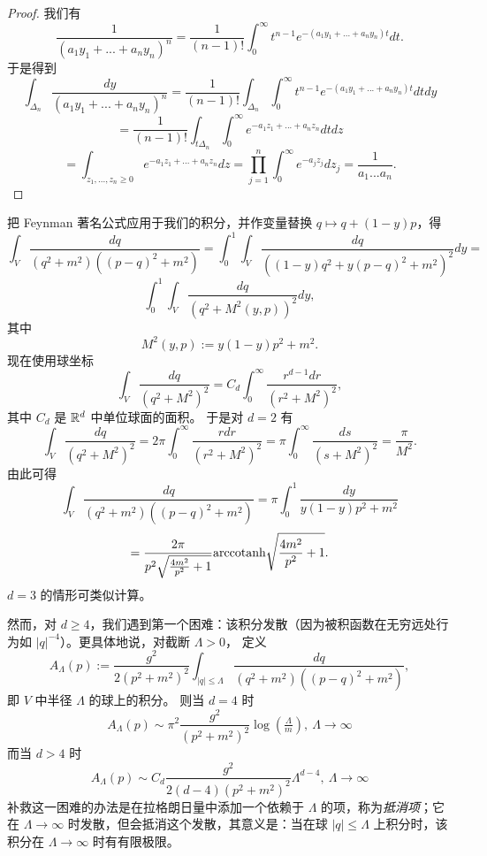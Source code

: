 \begin{proof} 我们有
$$
\frac{1}{(a_1y_1+...+a_ny_n)^n}=\frac{1}{(n-1)!}\int_0^\infty t^{n-1}e^{-(a_1y_1+...+a_ny_n)t}dt.
$$
于是得到
$$
\int_{\Delta_n}\frac{dy}{(a_1y_1+...+a_ny_n)^n}=\frac{1}{(n-1)!}\int_{\Delta_n}\int_0^\infty t^{n-1}e^{-(a_1y_1+...+a_ny_n)t}dtdy
$$
$$
=\frac{1}{(n-1)!}\int_{t\Delta_n}\int_0^\infty e^{-a_1z_1+...+a_nz_n}dtdz
$$
$$
=\int_{z_1,...,z_n\ge 0}e^{-a_1z_1+...+a_nz_n}dz=\prod_{j=1}^n\int_0^\infty e^{-a_jz_j}dz_j=\frac{1}{a_1...a_n}.
$$
\end{proof}


把 Feynman 著名公式应用于我们的积分，并作变量替换
$q\mapsto q+(1-y)p$，得
$$
\int_V \frac{dq}{(q^2+m^2)((p-q)^2+m^2)}=\int_0^1\int_V \frac{dq}{((1-y)q^2+y(p-q)^2+m^2)^2}dy=
$$
$$
\int_0^1\int_V \frac{dq}{(q^2+M^2(y,p))^2}dy,
$$
其中
$$
M^2(y,p):=y(1-y)p^2+m^2.
$$
现在使用球坐标
$$
\int_V \frac{dq}{(q^2+M^2)^2}=C_d\int_0^\infty \frac{r^{d-1}dr}{(r^2+M^2)^2},
$$
其中 $C_d$ 是 $\Bbb R^d$ 中单位球面的面积。
于是对 $d=2$ 有
$$
\int_V \frac{dq}{(q^2+M^2)^2}=2\pi\int_0^\infty \frac{rdr}{(r^2+M^2)^2}=\pi \int_0^\infty\frac{ds}{(s+M^2)^2}=\frac{\pi}{M^2}.
$$
由此可得
$$
\int_V \frac{dq}{(q^2+m^2)((p-q)^2+m^2)}=\pi\int_0^1 \frac{dy}{y(1-y)p^2+m^2}
$$
$$
=\frac{2\pi}{p^2\sqrt{\frac{4 m^2}{p^2} + 1}}{\rm arccotanh}\sqrt{\frac{4 m^2}{p^2} + 1}.
$$
$d=3$ 的情形可类似计算。

然而，对 $d\ge 4$，我们遇到第一个困难：该积分发散（因为被积函数在无穷远处行为如 $|q|^{-4}$）。更具体地说，对截断 $\Lambda>0$，
定义
$$
A_\Lambda(p):=\frac{g^2}{2(p^2+m^2)^2}\int_{|q|\le \Lambda} \frac{dq}{(q^2+m^2)((p-q)^2+m^2)},
$$
即 $V$ 中半径 $\Lambda$ 的球上的积分。
则当 $d=4$ 时
$$
A_\Lambda(p)\sim \pi^2\frac{g^2}{(p^2+m^2)^2}\log(\tfrac{\Lambda}{m}),\ \Lambda\to \infty
$$
而当 $d>4$ 时
$$
A_\Lambda(p)\sim C_d\frac{g^2}{2(d-4)(p^2+m^2)^2}\Lambda^{d-4},\ \Lambda\to \infty
$$
补救这一困难的办法是在拉格朗日量中添加一个依赖于 $\Lambda$ 的项，称为\emph{抵消项}；它在 $\Lambda\to\infty$ 时发散，但会抵消这个发散，其意义是：当在球 $|q|\le \Lambda$ 上积分时，该积分在 $\Lambda\to\infty$ 时有有限极限。

